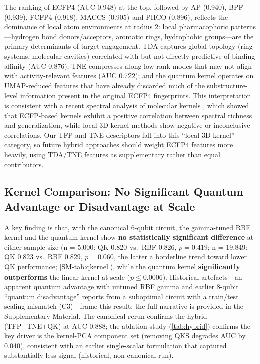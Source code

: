 \documentclass[11pt,a4paper]{article}
\begin{document}
The ranking of ECFP4 (AUC \num{0.948}) at the top, followed by AP (\num{0.940}), BPF (\num{0.939}), FCFP4 (\num{0.918}), MACCS (\num{0.905}) and PHCO (\num{0.896}), reflects the dominance of local atom environments at radius 2: local pharmacophoric patterns---hydrogen bond donors/acceptors, aromatic rings, hydrophobic groups---are the primary determinants of target engagement. TDA captures global topology (ring systems, molecular cavities) correlated with but not directly predictive of binding affinity (AUC \num{0.876}); TNE compresses along low-rank modes that may not align with activity-relevant features (AUC \num{0.722}); and the quantum kernel operates on UMAP-reduced features that have already discarded much of the substructure-level information present in the original ECFP4 fingerprints. This interpretation is consistent with a recent spectral analysis of molecular kernels \citep{jamali2025spectral}, which showed that ECFP-based kernels exhibit a positive correlation between spectral richness and generalization, while local 3D kernel methods show negative or inconclusive correlations. Our TFP and TNE descriptors fall into this ``local 3D kernel'' category, so future hybrid approaches should weight ECFP4 features more heavily, using TDA/TNE features as supplementary rather than equal contributors.

\subsection{Kernel Comparison: No Significant Quantum Advantage or Disadvantage at Scale}

A key finding is that, with the canonical 6-qubit circuit, the gamma-tuned RBF kernel and the quantum kernel show \textbf{no statistically significant difference} at either sample size (n = 5,000: QK \num{0.820} vs.\ RBF \num{0.826}, $p = 0.419$; n = 19,849: QK \num{0.823} vs.\ RBF \num{0.829}, $p = 0.060$, the latter a borderline trend toward lower QK performance; \cref{SM-tab:qkernel}), while the quantum kernel \textbf{significantly outperforms} the linear kernel at scale ($p \leq 0.0006$). Historical artefacts---an apparent quantum advantage with untuned RBF gamma and earlier 8-qubit ``quantum disadvantage'' reports from a suboptimal circuit with a train/test scaling mismatch (C3)---frame this result; the full narrative is provided in the Supplementary Material. The canonical rerun confirms the hybrid (TFP+TNE+QK) at AUC \num{0.888}; the ablation study (\cref{tab:hybrid}) confirms the key driver is the kernel-PCA component set (removing QKS degrades AUC by \num{0.040}), consistent with an earlier single-scalar formulation that captured substantially less signal (historical, non-canonical run).
\end{document}

